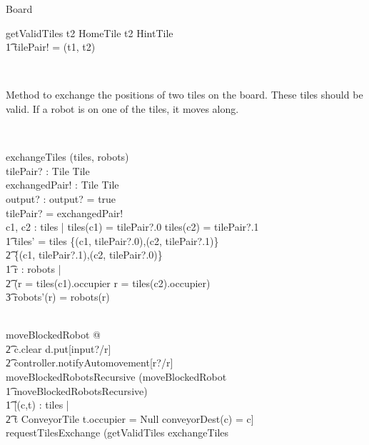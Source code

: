 \begin{class}{Board}
\begin{schema}{getValidTiles}
t2 \not \in HomeTile \wedge t2 \not \in HintTile \; \; \wedge \\ \t1
tilePair! = (t1, t2)
\end{schema} \\
\begin{classcom}
Method to exchange the positions of two tiles on the board. These tiles should be valid. If a robot is on one of the tiles, it moves along.
\end{classcom} \\
\begin{schema}{exchangeTiles}
\Delta(tiles, robots) \\
tilePair? : Tile \cross Tile \\
exchangedPair! : Tile \cross Tile \\
output? : \bool
\where
output? = true\\
tilePair? = exchangedPair! \\
\also \also \also
\exists c1, c2 : \dom tiles | tiles(c1) = tilePair?.0 \wedge tiles(c2) = tilePair?.1 \; \; \wedge \\ \t1
tiles' = tiles \setminus \{(c1, tilePair?.0),(c2, tilePair?.1)\} \cup \\ \t2 \{(c1, tilePair?.1),(c2, tilePair?.0)\}
\\ \t1 \forall r : \dom robots | \\ \t2 (r \not = tiles(c1).occupier \wedge r \not = tiles(c2).occupier) \Rightarrow \\ \t3 robots'(r) = robots(r)
\end{schema} \\
moveBlockedRobot \sdef [c, d : \dom tiles, r : \dom robots | \\ \t1 tiles(c) \in ConveyorTile \wedge tiles(c).occupier = r \; \; \wedge \\ \t1 conveyorDest(c) \not = c \wedge conveyorDest(c) = d] @ \\ \t2 c.clear \wedge d.put[input?/r] \; \; \wedge \\ \t2 controller.notifyAutomovement[r?/r] \\
moveBlockedRobotsRecursive \sdef (moveBlockedRobot \; \; \comp \\ \t1 moveBlockedRobotsRecursive) \; \; [] \\ \t1 [\neg \exists (c,t) : tiles | \\ \t2 t \in ConveyorTile \wedge t.occupier \not = Null \wedge conveyorDest(c) = c] \\
\znewpage
requestTilesExchange \sdef (getValidTiles \comp exchangeTiles \; \; \comp \\

\end{class}
